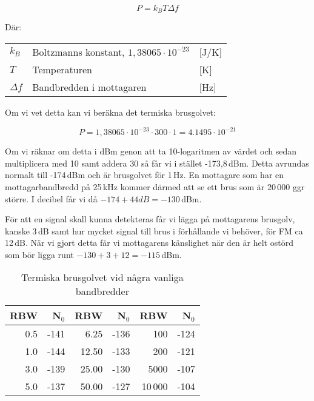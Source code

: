 \begin{equation}
	P=k_BT\Delta f
\end{equation}

Där:

\begin{tabular}{lll}
	$k_B$      & Boltzmanns konstant, $1,38065\cdot 10^{-23}$ & [J/K] \\
	$T$        & Temperaturen                                 & [K]   \\
	$\Delta f$ & Bandbredden i mottagaren                     & [Hz]
\end{tabular}

Om vi vet detta kan vi beräkna det termiska brusgolvet:

$$P = 1,38065\cdot 10^{-23} \cdot 300 \cdot 1 = 4.1495\cdot 10^{-21}$$

Om vi räknar om detta i dBm genon att ta 10-logaritmen av värdet och sedan
multiplicera med 10 samt addera 30 så får vi i stället -173,8\,dBm. Detta
avrundas normalt till -174\,dBm och är brusgolvet för 1\,Hz. En mottagare som
har en mottagarbandbredd på 25\,kHz kommer därmed att se ett brus som är
20\,000 ggr större. I decibel får vi då $-174 + 44 dB = -130$\,dBm.

För att en signal skall kunna detekteras får vi lägga på mottagarens brusgolv,
kanske 3\,dB samt hur mycket signal till brus i förhållande vi behöver, för FM
ca 12\,dB. När vi gjort detta får vi mottagarens känslighet när den är helt
ostörd som bör ligga runt $-130 + 3 + 12 = -115$\,dBm.

\begin{table}[H]
\centering
\begin{tabular}{rr|rr|rr}
	\textbf{RBW} & \textbf{N$_0$} & \textbf{RBW} & \textbf{N$_0$} & \textbf{RBW} & \textbf{N$_0$} \\ \hline
	         0.5 &           -141 &         6.25 &           -136 &          100 &           -124 \\
	         1.0 &           -144 &        12.50 &           -133 &          200 &           -121 \\
	         3.0 &           -139 &        25.00 &           -130 &         5000 &           -107 \\
	         5.0 &           -137 &        50.00 &           -127 &        10\,000 &           -104
\end{tabular}
\caption{Termiska brusgolvet vid några vanliga bandbredder}
\end{table}

